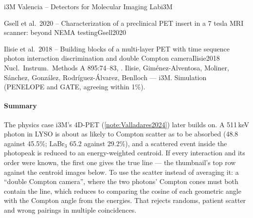 \begin{programnote}{i3M Valencia -- Detectors for Molecular Imaging Lab}{i3M}
\begin{papernote}{Gsell et al.\ 2020 -- Characterization of a preclinical PET insert in a 7 tesla MRI scanner: beyond NEMA testing}{Gsell2020}
\end{papernote}

\begin{papernote}{Ilisie et al.\ 2018 -- Building blocks of a multi-layer PET with time sequence photon interaction discrimination and double Compton camera}{Ilisie2018}
Nucl.\ Instrum.\ Methods A 895:74--83, .
Ilisie, Giménez-Alventosa, Moliner, Sánchez, González, Rodríguez-Álvarez,
Benlloch --- i3M. Simulation (PENELOPE and GATE, agreeing within 1\%).

\paragraph{Summary}
The physics case i3M's 4D-PET (\ref{note:Valladares2024}) later builds on. A 511\,keV photon in LYSO is about as likely to
Compton scatter as to be absorbed (48.8 against 45.5\%; LaBr$_3$ 65.2 against
29.2\%), and a scattered event inside the photopeak is reduced to an
energy-weighted centroid. If every interaction and its order were known, the
first one gives the true line --- the thumbnail's top row against the centroid
images below. To use the scatter instead of averaging it: a ``double Compton
camera'', where the two photons' Compton cones must both contain the line, which
reduces to comparing the cosine of each geometric angle with the Compton angle
from the energies. That rejects randoms, patient scatter and wrong pairings in
multiple coincidences.


\end{papernote}
\end{programnote}
